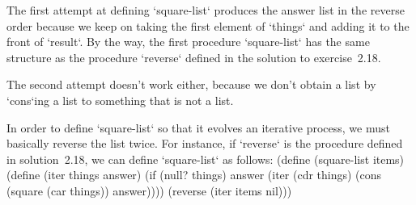 The first attempt at defining `square-list` produces the answer list in the reverse order because we keep on taking the first element of `things` and adding it to the front of `result`.  By the way, the first procedure `square-list` has the same structure as the procedure `reverse` defined in the solution to exercise~2.18.

The second attempt doesn't work either, because we don't obtain a list by `cons`ing a list to something that is not a list. 

In order to define `square-list` so that it evolves an iterative process, we must basically reverse the list twice. For instance, if `reverse` is the procedure defined in solution~2.18, we can define `square-list` as follows: 
\begtt\scm
(define (square-list items)
  (define (iter things answer)
    (if (null? things)
      answer
      (iter (cdr things)
            (cons (square (car things))
                  answer))))
  (reverse (iter items nil)))
\endtt
